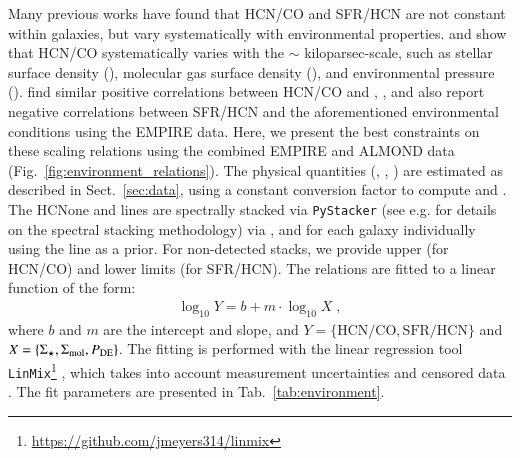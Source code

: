 \documentclass[letter, longauth]{aa} %
\begin{document}
Many previous works have found that HCN/CO and SFR/HCN are not constant within galaxies, but vary systematically with environmental properties.
\citet{Usero2015} and \citet{Gallagher2018a} show that HCN/CO systematically varies with the $\sim$ kiloparsec-scale, such as stellar surface density (\sigstar), molecular gas surface density (\sigmol), and environmental pressure (\pde).
\citet{Jimenez-Donaire2019} find similar positive correlations between HCN/CO and \sigstar, \sigmol, \pde and also report negative correlations between SFR/HCN and the aforementioned environmental conditions using the EMPIRE data.
Here, we present the best constraints on these scaling relations using the combined EMPIRE and ALMOND data (Fig.~\ref{fig:environment_relations}).
The physical quantities (\sigstar, \sigmol, \pde) are estimated as described in Sect.~\ref{sec:data}, using a constant \alphaco conversion factor to compute \sigmol and \pde.
The HCNone and \coone lines are spectrally stacked via  \texttt{PyStacker} (see e.g.  for details on the spectral stacking methodology) via \sigstar, \sigmol and \pde for each galaxy individually using the \coone line as a prior.
For non-detected stacks, we provide upper (for HCN/CO) and lower limits (for SFR/HCN).
The relations are fitted to a linear function of the form:
\begin{align}
	\log_{10} Y = b + m \cdot \log_{10} X \;,
\end{align}
where $b$ and $m$ are the intercept and slope, and $Y=\{\mathrm{HCN/CO}, \mathrm{SFR/HCN}\}$ and $X=\{\Sigma_{\star}, \Sigma_{\text{mol}}, P_{\text{DE}}\}$. 
The fitting is performed with the linear regression tool \texttt{LinMix}\footnote{
\url{https://github.com/jmeyers314/linmix}}
, which takes into account measurement uncertainties and censored data \citep[see e.g.][for more details on the fitting routine]{Neumann2023a}.
The fit parameters are presented in Tab.~\ref{tab:environment}.
\end{document}

